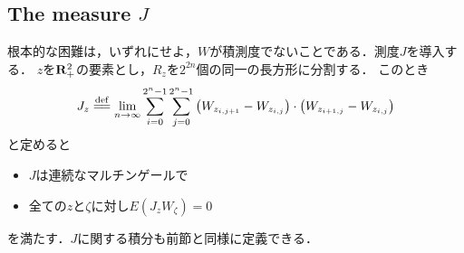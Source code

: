 \subsection{The measure $J$}
	根本的な困難は，いずれにせよ，$W$が積測度でないことである．測度$J$を導入する．
	$z$を$\mathbf{R}_{+}^{2}$の要素とし，$R_{z}$を$2^{2n}$個の同一の長方形に分割する．
	このとき
	\begin{align}
		J_{z} \defeq \lim_{n \to \infty} \sum_{i=0}^{2^{n}-1}\sum_{j=0}^{2^{n}-1} \left(W_{z_{i,j+1}} - W_{z_{i,j}}\right) 
		\cdot \left(W_{z_{i+1,j}} - W_{z_{i,j}}\right)
	\end{align}
	と定めると
	\begin{itemize}
		\item $J$は連続なマルチンゲールで
		\item 全ての$z$と$\zeta$に対し$E(J_{z} W_{\zeta}) = 0$
	\end{itemize}
	を満たす．$J$に関する積分も前節と同様に定義できる．
	